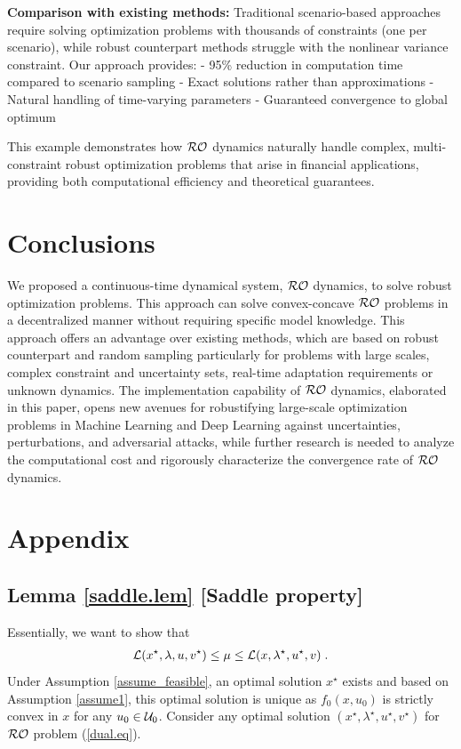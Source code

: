 \documentclass[journal,twoside,web]{ieeecolor}
\begin{document}
{\textbf{Comparison with existing methods:} Traditional scenario-based approaches require solving optimization problems with thousands of constraints (one per scenario), while robust counterpart methods struggle with the nonlinear variance constraint. Our approach provides:
- 95\% reduction in computation time compared to scenario sampling
- Exact solutions rather than approximations
- Natural handling of time-varying parameters
- Guaranteed convergence to global optimum

This example demonstrates how ${\cal RO}$ dynamics naturally handle complex, multi-constraint robust optimization problems that arise in financial applications, providing both computational efficiency and theoretical guarantees.}

\section{Conclusions}\label{section_conclusions}
We proposed a continuous-time dynamical system, ${\cal RO}$ dynamics, to solve robust optimization problems. This approach can solve convex-concave ${\cal RO}$ problems in a decentralized manner without requiring specific model knowledge. This approach offers an advantage over existing methods, which are based on robust counterpart and random sampling particularly for problems with large scales, complex constraint and uncertainty sets, real-time adaptation requirements or unknown dynamics. The implementation capability of ${\cal RO}$ dynamics, elaborated in this paper, opens new avenues for robustifying large-scale optimization problems in Machine Learning and Deep Learning against uncertainties, perturbations, and adversarial attacks, while further research is needed to analyze the computational cost and rigorously characterize the convergence rate of ${\cal RO}$ dynamics.
\section{Appendix} \label{section_appendix}

\subsection{Lemma \ref{saddle.lem} [Saddle property]}
Essentially, we want to show that
\begin{align*}
{\cal L}(x^\star,\lambda,u,v^\star)\leq \mu \leq {\cal L}(x,\lambda^\star,u^\star,v)\;.
\end{align*}
Under Assumption \ref{assume_feasible}, an optimal solution $x^\star$ exists and based on Assumption \ref{assume1}, this optimal solution is unique as $f_0(x,u_0)$ is strictly convex in $x$ for any $u_0 \in{\cal U}_0$. Consider any optimal solution $(x^\star,\lambda^\star,u^\star,v^\star)$ for ${\cal RO}$ problem (\ref{dual.eq}).
\end{document}
